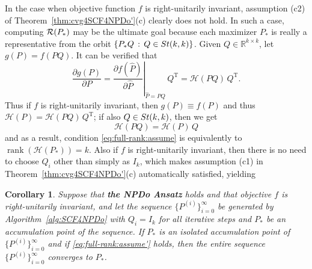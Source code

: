 \documentclass[11pt]{article}
\def\bbR{\mathbb{R}}
\def\scrH{\mathscr{H}}
\def\cR{{\cal R}}
\def\what{\widehat}
\newcommand\STM[2]{{\rm St}(#1,#2)}
\DeclareMathOperator{\rank}{rank}
\DeclareMathOperator{\T}{T}
\newtheorem{corollary}{Corollary}[section]
\theoremstyle{definition}
\numberwithin{equation}{section}
\begin{document}
In the case when objective function $f$ is right-unitarily invariant, assumption (c2) of
Theorem~\ref{thm:cvg4SCF4NPDo'}(c) clearly does not hold.
In such a case, computing
$\cR(P_*)$ may be the ultimate goal because each maximizer $P_*$ is really
a representative from the orbit $\{P_*Q\,:\,Q\in\STM{k}{k}\}$.
Given $Q\in\bbR^{k\times k}$, let $g(P)=f(PQ)$. It can be verified that
$$
\frac {\partial g(P)}{\partial P}=\left.\frac {\partial f(\what P)}{\partial\what P}\right|_{\what P=PQ}\,Q^{\T}=\scrH(PQ)\,Q^{\T}.
$$
Thus if $f$ is right-unitarily invariant, then $g(P)\equiv f(P)$ and thus $\scrH(P)=\scrH(PQ)\,Q^{\T}$; if also
$Q\in\STM{k}{k}$, then we get
$$
\scrH(PQ)=\scrH(P)\,Q
$$
and as a result, condition \eqref{eq:full-rank:assume} is equivalently
to $\rank(\scrH(P_*))=k$. Also if $f$ is right-unitarily invariant, then there is no need to
choose $Q_i$ other than simply as $I_k$, which makes assumption (c1) in Theorem~\ref{thm:cvg4SCF4NPDo'}(c) automatically
satisfied, yielding

\begin{corollary}\label{cor:cvg4SCF4NPDo'}
Suppose that {\bf the NPDo Ansatz} holds and that objective $f$ is right-unitarily invariant, and let the sequence $\{P^{(i)}\}_{i=0}^{\infty}$ be generated by Algorithm~\ref{alg:SCF4NPDo} with $Q_i=I_k$ for all iterative steps and $P_*$ be an accumulation
point of the sequence. If $P_*$ is an isolated accumulation point of $\{P^{(i)}\}_{i=0}^{\infty}$ and if
\eqref{eq:full-rank:assume'} holds, then the entire sequence $\{P^{(i)}\}_{i=0}^{\infty}$ converges to $P_*$.
\end{corollary}
\end{document}
